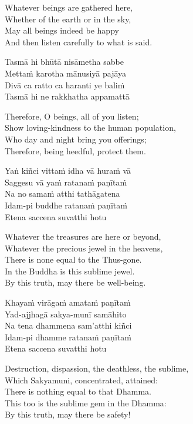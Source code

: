 \begin{english}
  Whatever beings are gathered here,\\
  Whether of the earth or in the sky,\\
  May all beings indeed be happy\\
  And then listen carefully to what is said.
\end{english}

Tasmā hi bhūtā nisāmetha sabbe\\
Mettaṁ karotha mānusiyā pajāya\\
Divā ca ratto ca haranti ye baliṁ\\
Tasmā hi ne rakkhatha appamattā

\begin{english}
  Therefore, O beings, all of you listen;\\
  Show loving-kindness to the human population,\\
  Who day and night bring you offerings;\\
  Therefore, being heedful, protect them.
\end{english}

Yaṅ kiñci vittaṁ idha vā huraṁ vā\\
Saggesu vā yaṁ ratanaṁ paṇītaṁ\\
Na no samaṁ atthi tathāgatena\\
Idam-pi buddhe ratanaṁ paṇītaṁ\\
Etena saccena suvatthi hotu

\begin{english}
  Whatever the treasures are here or beyond,\\
  Whatever the precious jewel in the heavens,\\
  There is none equal to the Thus-gone.\\
  In the Buddha is this sublime jewel.\\
  By this truth, may there be well-being.
\end{english}

Khayaṁ virāgaṁ amataṁ paṇītaṁ\\
Yad-ajjhagā sakya-munī samāhito\\
Na tena dhammena sam’atthi kiñci\\
Idam-pi dhamme ratanaṁ paṇītaṁ\\
Etena saccena suvatthi hotu

\begin{english}
  Destruction, dispassion, the deathless, the sublime,\\
  Which Sakyamuni, concentrated, attained:\\
  There is nothing equal to that Dhamma.\\
  This too is the sublime gem in the Dhamma:\\
  By this truth, may there be safety!
\end{english}

